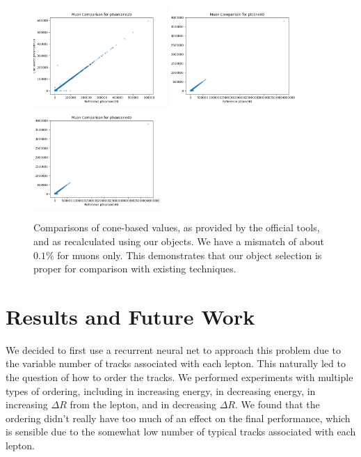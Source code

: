 \begin{figure}[htbp]
    \includegraphics[width=0.45\textwidth]{Images/RNN/muon_ptvarcone20.png}
    \includegraphics[width=0.45\textwidth]{Images/RNN/muon_ptcone40.png}
    \includegraphics[width=0.45\textwidth]{Images/RNN/muon_ptvarcone40.png}
    \caption{Comparisons of cone-based values, as provided by the official tools, and as recalculated using our objects. We have a mismatch of about $0.1\%$ for muons only. This demonstrates that our object selection is proper for comparison with existing techniques.}
    \label{fig:cone_compare}
\end{figure}

\chapter{Results and Future Work}

We decided to first use a recurrent neural net to approach this problem due to the variable number of tracks associated with each lepton. This naturally led to the question of how to order the tracks. We performed experiments with multiple types of ordering, including in increasing energy, in decreasing energy, in increasing $\Delta R$ from the lepton, and in decreasing $\Delta R$. We found that the ordering didn't really have too much of an effect on the final performance, which is sensible due to the somewhat low number of typical tracks associated with each lepton.

